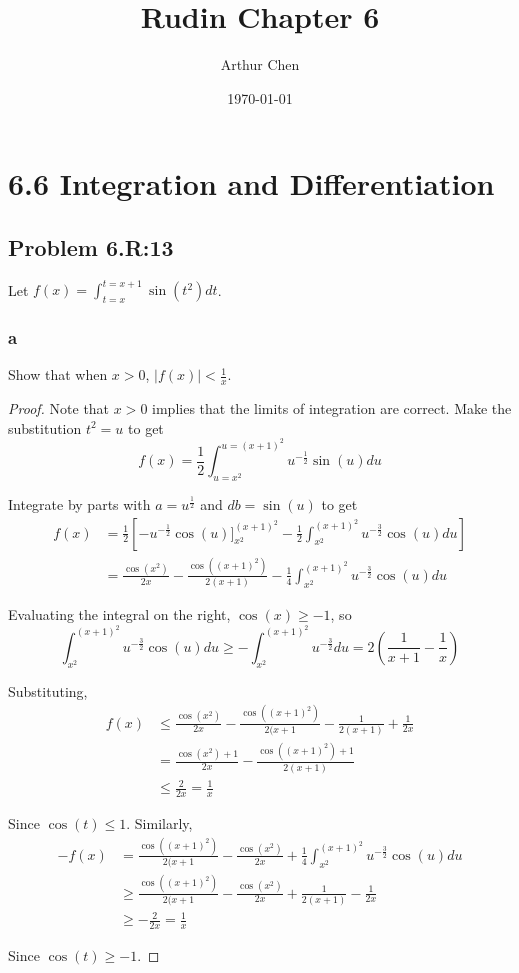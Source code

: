 \documentclass{amsart}
\author{Arthur Chen}
\title{Rudin Chapter 6}
\date{\today}
\begin{document}
\section*{6.6 Integration and Differentiation}

\subsection*{Problem 6.R:13}
Let $f(x) = \int_{t=x}^{t=x+1} \sin(t^2)dt$.
\subsubsection*{a}
Show that when $x>0$, $|f(x)| < \frac{1}{x}$. 

\begin{proof}
Note that $x>0$ implies that the limits of integration are correct. Make the substitution $t^2 = u$ to get
\[
f(x) = \frac{1}{2} \int_{u = x^2}^{u = (x+1)^2} u^{-\frac{1}{2}} \sin(u)du
\]

Integrate by parts with $a = u^{\frac{1}{2}}$ and $db = \sin(u)$ to get
\begin{align*}
f(x) &= \frac{1}{2}
\left[
-u^{-\frac{1}{2}}\cos(u)]_{x^2}^{(x+1)^2}
-\frac{1}{2} \int_{x^2}^{(x+1)^2} u^{-\frac{3}{2}} \cos(u)du
\right] \\
&= \frac{\cos(x^2)}{2x} - \frac{\cos((x+1)^2)}{2(x+1)} - \frac{1}{4} \int_{x^2}^{(x+1)^2} u^{-\frac{3}{2}} \cos(u)du
\end{align*}

Evaluating the integral on the right, $\cos(x) \geq -1$, so
\[
\int_{x^2}^{(x+1)^2} u^{-\frac{3}{2}} \cos(u)du
\geq - \int_{x^2}^{(x+1)^2} u^{-\frac{3}{2}} du
= 2 \left(\frac{1}{x+1} - \frac{1}{x} \right)
\]

Substituting,
\begin{align*}
f(x) &\leq \frac{\cos(x^2)}{2x} - \frac{\cos((x+1)^2)}{2(x+1} - \frac{1}{2(x+1)} + \frac{1}{2x} \\
&= \frac{\cos(x^2) + 1}{2x} - \frac{\cos((x+1)^2) + 1}{2(x+1)} \\
& \leq \frac{2}{2x} = \frac{1}{x}
\end{align*}

Since $\cos(t) \leq 1$. Similarly,
\begin{align*}
-f(x) &= \frac{\cos((x+1)^2)}{2(x+1} - \frac{\cos(x^2)}{2x} + \frac{1}{4} \int_{x^2}^{(x+1)^2} u^{-\frac{3}{2}} \cos(u)du \\
&\geq \frac{\cos((x+1)^2)}{2(x+1} - \frac{\cos(x^2)}{2x} + \frac{1}{2(x+1)} - \frac{1}{2x} \\
&\geq -\frac{2}{2x} = \frac{1}{x}
\end{align*}

Since $\cos(t) \geq -1$.

\end{proof}
\end{document}
